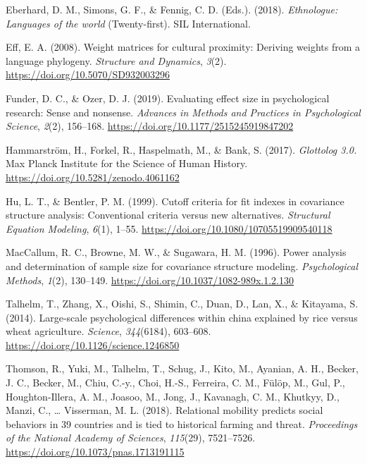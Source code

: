 \documentclass[
  man,floatsintext]{apa6}
\begin{document}
Eberhard, D. M., Simons, G. F., \& Fennig, C. D. (Eds.). (2018). \emph{Ethnologue: Languages of the world} (Twenty-first). SIL International.

Eff, E. A. (2008). Weight matrices for cultural proximity: Deriving weights from a language phylogeny. \emph{Structure and Dynamics}, \emph{3}(2). \url{https://doi.org/10.5070/SD932003296}

Funder, D. C., \& Ozer, D. J. (2019). Evaluating effect size in psychological research: Sense and nonsense. \emph{Advances in Methods and Practices in Psychological Science}, \emph{2}(2), 156--168. \url{https://doi.org/10.1177/2515245919847202}

Hammarström, H., Forkel, R., Haspelmath, M., \& Bank, S. (2017). \emph{Glottolog 3.0.} Max Planck Institute for the Science of Human History. \url{https://doi.org/10.5281/zenodo.4061162}

Hu, L. T., \& Bentler, P. M. (1999). Cutoff criteria for fit indexes in covariance structure analysis: Conventional criteria versus new alternatives. \emph{Structural Equation Modeling}, \emph{6}(1), 1--55. \url{https://doi.org/10.1080/10705519909540118}

MacCallum, R. C., Browne, M. W., \& Sugawara, H. M. (1996). Power analysis and determination of sample size for covariance structure modeling. \emph{Psychological Methods}, \emph{1}(2), 130--149. \url{https://doi.org/10.1037/1082-989x.1.2.130}

Talhelm, T., Zhang, X., Oishi, S., Shimin, C., Duan, D., Lan, X., \& Kitayama, S. (2014). Large-scale psychological differences within china explained by rice versus wheat agriculture. \emph{Science}, \emph{344}(6184), 603--608. \url{https://doi.org/10.1126/science.1246850}

Thomson, R., Yuki, M., Talhelm, T., Schug, J., Kito, M., Ayanian, A. H., Becker, J. C., Becker, M., Chiu, C.-y., Choi, H.-S., Ferreira, C. M., Fülöp, M., Gul, P., Houghton-Illera, A. M., Joasoo, M., Jong, J., Kavanagh, C. M., Khutkyy, D., Manzi, C., \ldots{} Visserman, M. L. (2018). Relational mobility predicts social behaviors in 39 countries and is tied to historical farming and threat. \emph{Proceedings of the National Academy of Sciences}, \emph{115}(29), 7521--7526. \url{https://doi.org/10.1073/pnas.1713191115}
\end{document}
